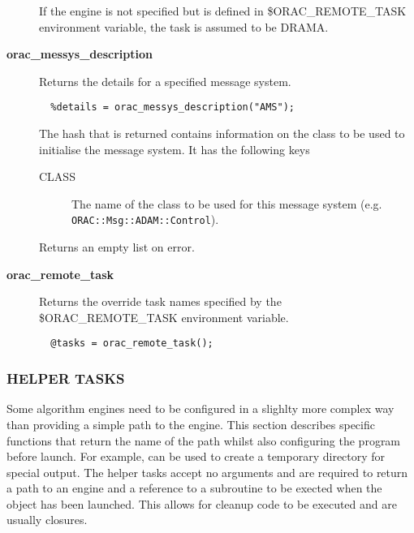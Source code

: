 \begin{description}
If the engine is not specified but is defined in \$ORAC\_REMOTE\_TASK
environment variable, the task is assumed to be DRAMA.


\item[{\textbf{orac\_messys\_description}}] \mbox{}

Returns the details for a specified message system.

\begin{verbatim}
  %details = orac_messys_description("AMS");
\end{verbatim}


The hash that is returned contains information on the
class to be used to initialise the message system.
It has the following keys

\begin{description}

\item[{CLASS}] \mbox{}

The name of the class to be used for this message system
(e.g. \texttt{ORAC::Msg::ADAM::Control}).

\end{description}


Returns an empty list on error.


\item[{\textbf{orac\_remote\_task}}] \mbox{}

Returns the override task names specified by the \$ORAC\_REMOTE\_TASK
environment variable.

\begin{verbatim}
  @tasks = orac_remote_task();
\end{verbatim}
\end{description}
\subsubsection*{HELPER TASKS\label{ORAC::Inst::Defn_HELPER_TASKS}}


Some algorithm engines need to be configured in a slighlty more complex
way than providing a simple path to the engine. This section
describes specific functions that return the name of the path whilst
also configuring the program before launch. For example, can be used
to create a temporary directory for special output. The helper tasks
accept no arguments and are required to return a path to an
engine and a reference to a subroutine to be exected when the
object has been launched. This allows for cleanup code to be executed
and are usually closures.


